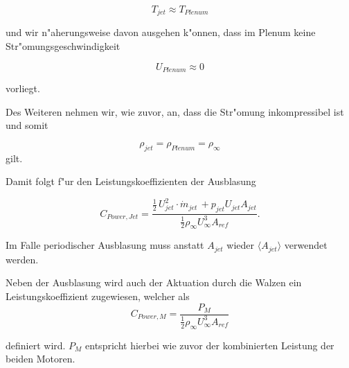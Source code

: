 	\begin{equation}
	\label{eq:T-Vereinfachung}
		T_{jet} \approx T_{Plenum}
	\end{equation}

und wir n"aherungsweise davon ausgehen k"onnen, dass im Plenum keine Str"omungsgeschwindigkeit 

	\begin{equation}
	\label{eq:Up}
		U_{Plenum} \approx 0
	\end{equation}

vorliegt.

Des Weiteren nehmen wir, wie zuvor, an, dass die Str"omung inkompressibel ist und somit

	\begin{equation}
	\label{eq:Inkompressibilitaet}
		\rho_{jet} = \rho_{Plenum} = \rho_{\infty}
	\end{equation}
gilt.

Damit folgt f"ur den Leistungskoeffizienten der Ausblasung

	\begin{equation}
	\label{eq:CPowerJ vereinfacht}
		C_{Power,Jet} = \frac{\frac{1}{2}\,U^2_{jet} \cdot \dot{m}_{jet} \, + p_{jet}U_{jet}A_{jet}}{\frac{1}{2}\rho_{\infty}U^3_{\infty}A_{ref}}.
	\end{equation}

Im Falle periodischer Ausblasung muss anstatt $A_{jet}$ wieder $\langle{A_{jet}}\rangle$ verwendet werden.

Neben der Ausblasung wird auch der Aktuation durch die Walzen ein Leistungskoeffizient zugewiesen, welcher als
		\begin{equation}
		\label{eq:def-CPowerM}
			C_{Power,M} = \frac{P_M}{\frac{1}{2}\rho_{\infty}U^3_{\infty}A_{ref}}
		\end{equation}
		
definiert wird.
$P_M$ entspricht hierbei wie zuvor der kombinierten Leistung der beiden Motoren.